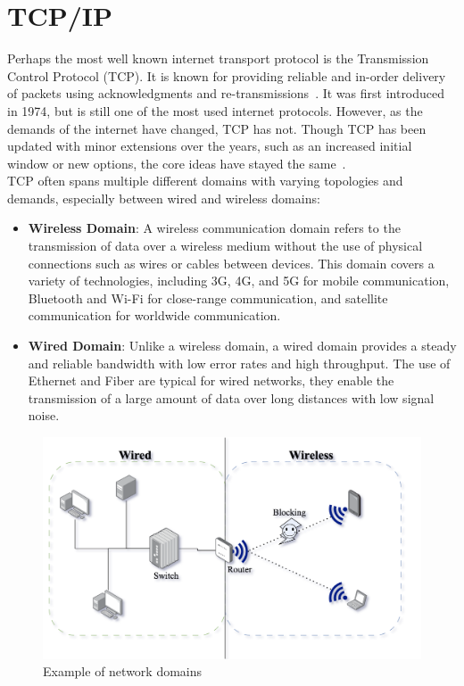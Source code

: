 \documentclass[a4paper,english, 12pt]{report}
\begin{document}
\section{TCP/IP}
Perhaps the most well known internet transport protocol is the Transmission Control Protocol (TCP). It is known for providing reliable and in-order delivery of packets using acknowledgments and re-transmissions~\cite{Eddy_2022}. It was first introduced in 1974, but is still one of the most used internet protocols. However, as the demands of the internet have changed, TCP has not. Though TCP has been updated with minor extensions over the years, such as an increased initial window or new options, the core ideas have stayed the same~\cite{rfc8803}.\\

TCP often spans multiple different domains with varying topologies and demands, especially between wired and wireless domains:
\begin{itemize}
  \item \textbf{Wireless Domain}: A wireless communication domain refers to the transmission of data over a wireless medium without the use of physical connections such as wires or cables between devices. This domain covers a variety of technologies, including 3G, 4G, and 5G for mobile communication, Bluetooth and Wi-Fi for close-range communication, and satellite communication for worldwide communication.
  \item \textbf{Wired Domain}: Unlike a wireless domain, a wired domain provides a steady and reliable bandwidth with low error rates and high throughput. The use of Ethernet and Fiber are typical for wired networks, they enable the transmission of a large amount of data over long distances with low signal noise. 
\end{itemize}

\begin{figure}[h] %
	\centering
	\includegraphics[scale=0.65]{../diagrams/drawio/domains.png}
  	\caption{Example of network domains}
  	\label{fig:domains}
\end{figure}
\end{document}
